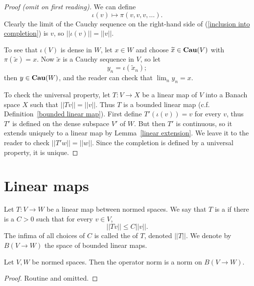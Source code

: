 \begin{proof}[Proof (omit on first reading)]
We can define
\begin{equation}\label{inclusion into completion}
\iota(v) \mapsto \pi(v, v, v, \dots).
\end{equation}
Clearly the limit of the Cauchy sequence on the right-hand side of (\ref{inclusion into completion}) is $v$, so $||\iota(v)|| = ||v||$.

To see that $\iota(V)$ is dense in $W$, let $x \in W$ and choose $\widetilde x \in \mathbf{Cau} (V)$ with $\pi(\widetilde x) = x$.
Now $\widetilde x$ is a Cauchy sequence in $V$, so let
\[y_{n} = \iota(\widetilde x_{n});\]
then $y \in \mathbf{Cau} (W)$, and the reader can check that $\lim_{n} y_{n} = x$.

To check the universal property, let $T: V \to X$ be a linear map of $V$ into a Banach space $X$ such that $||Tv|| = ||v||$.
Thus $T$ is a bounded linear map (c.f. Definition~\ref{bounded linear map}). First define $T'(\iota(v)) = v$ for every $v$, thus $T'$ is defined on the dense subspace $V'$ of $W$.
But then $T'$ is continuous, so it extends uniquely to a linear map by Lemma~\ref{linear extension}. We leave it to the reader to check $||T'w|| = ||w||$.
Since the completion is defined by a universal property, it is unique.
\end{proof}

\section{Linear maps}
\begin{definition}\label{bounded linear map}
Let $T: V\to W$ be a linear map between normed spaces. We say that $T$ is a  if there is a $C>0$ such that for every $v \in V$,
\[||Tv|| \leq C||v||.\]
The infima of all choices of $C$ is called the  of $T$, denoted $||T||$.
We denote by $B(V \to W)$ the space of bounded linear maps.
\end{definition}

\begin{lemma}
Let $V,W$ be normed spaces.
Then the operator norm is a norm on $B(V \to W)$.
\end{lemma}
\begin{proof}
Routine and omitted.
\end{proof}

